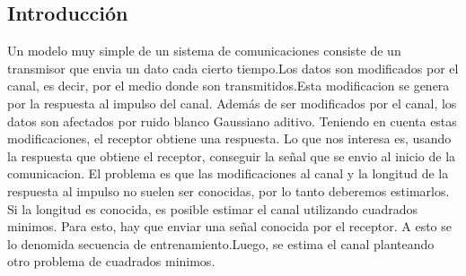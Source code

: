 \documentclass{article}
\begin{document}
\begin{multicols}{2}

\section{Introducción}





Un modelo muy simple de un sistema de comunicaciones consiste de un transmisor que envia un dato cada cierto tiempo.Los datos son modificados por el canal, es decir, por el medio donde son transmitidos.Esta modificacion se genera por la respuesta al impulso del
canal. Además de ser modificados por el canal, los datos son afectados por ruido blanco Gaussiano aditivo. Teniendo en cuenta estas modificaciones, el receptor obtiene una respuesta.
Lo que nos interesa es, usando la respuesta que obtiene el receptor, conseguir la señal que se envio al inicio de la comunicacion. El problema es que las modificaciones al canal y la longitud de la respuesta al impulso no suelen ser conocidas, por lo tanto deberemos estimarlos. 
Si la longitud es conocida, es posible estimar el canal utilizando cuadrados minimos. Para esto, hay que enviar una señal conocida por el receptor. A esto se lo denomida secuencia de entrenamiento.Luego, se estima el canal planteando otro problema de cuadrados minimos. 




\end{multicols}
\end{document}
